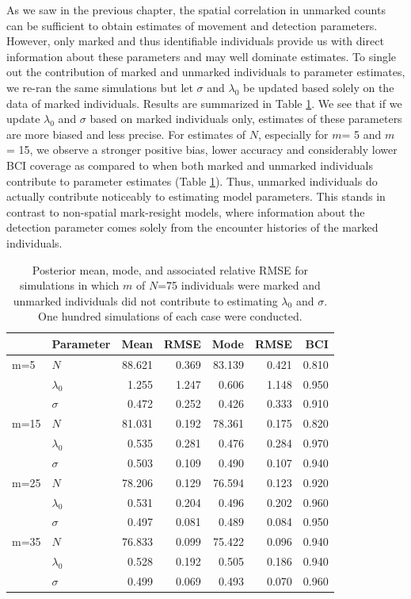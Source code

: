 As we saw in the previous chapter, the spatial correlation in unmarked
counts can be sufficient to obtain estimates of movement and detection
parameters. However, only marked and thus identifiable individuals
provide us with direct information about these parameters and may well
dominate estimates.  To single out the contribution of marked and
unmarked individuals to parameter estimates, we re-ran the same
simulations but let $\sigma$ and $\lambda_0$ be updated based solely
on the data of marked individuals. Results are summarized in
Table \ref{partialID.tab.sim2}.  We see that if we update $\lambda_0$
and $\sigma$ based on marked individuals only, estimates of these
parameters are more biased and less precise. For estimates of $N$,
especially for $m$= 5 and $m$ = 15, we observe a stronger positive
bias, lower accuracy and considerably lower BCI coverage as compared
to when both marked and unmarked individuals contribute to parameter
estimates (Table \ref{partialID.tab.sim2}). Thus, unmarked individuals
do actually contribute noticeably to estimating model parameters. This stands in contrast to non-spatial mark-resight models, where information about the detection parameter comes solely from the encounter histories of the marked individuals.

\begin{table}[ht]
\centering
\caption{Posterior mean, mode, and associated relative RMSE for simulations in
  which $m$ of $N$=75 individuals were marked and unmarked individuals
  did not contribute to estimating $\lambda_0$ and $\sigma$.
  One hundred simulations of each case were conducted. }
\begin{tabular}{llrrrrr}
\hline
     &	Parameter    &	Mean   &	RMSE  &	Mode   &	RMSE &	BCI    \\
     \hline
 m=5 &	$N$          &	88.621 &	0.369 &	83.139 &	0.421 &	0.810  \\
     &	$\lambda_0$  &	1.255  &	1.247 &	0.606  &	1.148 &	0.950  \\
     &	$\sigma$     &	0.472  &	0.252 &	0.426  &	0.333 &	0.910  \\
     \hline
 m=15&	$N$          &	81.031 &	0.192 &	78.361 &	0.175 &	0.820  \\
     &	$\lambda_0$  &	0.535  &	0.281 &	0.476  &	0.284 &	0.970  \\
     &	$\sigma$     &	0.503  &	0.109 &	0.490  &	0.107 &	0.940  \\
     \hline
 m=25&	$N$          &	78.206 &	0.129 &	76.594 &	0.123 &	0.920  \\
     &	$\lambda_0$  &	0.531  &	0.204 &	0.496  &	0.202 &	0.960  \\
     &	$\sigma$     &	0.497  &	0.081 &	0.489  &	0.084 &	0.950  \\
     \hline
 m=35&	$N$          &	76.833 &	0.099 &	75.422 &	0.096 &	0.940  \\
     &	$\lambda_0$  &	0.528  &	0.192 &	0.505  &	0.186 &	0.940  \\
     &	$\sigma$     &	0.499  &	0.069 &	0.493  &	0.070 &	0.960  \\
 \hline
\end{tabular}
\label{partialID.tab.sim2}
\end{table}


